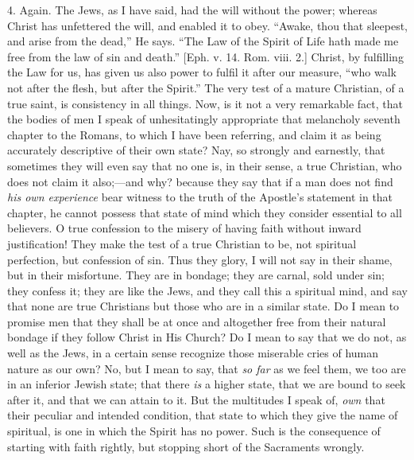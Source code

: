4. Again. The Jews, as I have said, had the will without the power;
whereas Christ has unfettered the will, and enabled it to obey.
``Awake, thou that sleepest, and arise from the dead,'' He
says. ``The Law of the Spirit of Life hath made me free from the
law of sin and death.'' [Eph. v. 14. Rom. viii. 2.] Christ, by
fulfilling the Law for us, has given us also power to fulfil it after
our measure, ``who walk not after the flesh, but after the
Spirit.'' The very test of a mature Christian, of a true saint, is
consistency in all things. Now, is it not a very remarkable fact, that
the bodies of men I speak of unhesitatingly appropriate that
melancholy seventh chapter to the Romans, to which I have been
referring, and claim it as being accurately descriptive of their own
state? Nay, so strongly and earnestly, that sometimes they will even
say that no one is, in their sense, a true Christian, who does not
claim it also;—and why? because they say that if a man does not find
\emph{his own experience} bear witness to the truth of the Apostle's
statement in that chapter, he cannot possess that state of mind which
they consider essential to all believers. O true confession to the
misery of having faith without inward justification! They make the
test of a true Christian to be, not spiritual perfection, but
confession of sin. Thus they glory, I will not say in their shame, but
in their misfortune. They are in bondage; they are carnal, sold under
sin; they confess it; they are like the Jews, and they call this a
spiritual mind, and say that none are true Christians but those who
are in a similar state. Do I mean to promise men that they shall be at
once and altogether free from their natural bondage if they follow
Christ in His Church? Do I mean to say that we do not, as well as the
Jews, in a certain sense recognize those miserable cries of human
nature as our own? No, but I mean to say, that \emph{so far} as we
feel them, we too are in an inferior Jewish state; that there \emph{is}
a higher state, that we are bound to seek after it, and that we can
attain to it. But the multitudes I speak of, \emph{own} that their
peculiar and intended condition, that state to which they give the
name of spiritual, is one in which the Spirit has no power. Such is
the consequence of starting with faith rightly, but stopping short of
the Sacraments wrongly.


